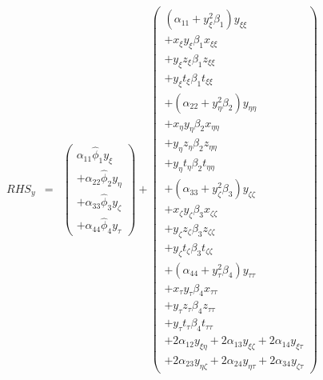\begin{eqnarray}
RHS_y
&=&
\left(
\begin{array}{r}
\alpha_{11} \widehat{\phi}_1 y_{\xi} 
\\
+
\alpha_{22} \widehat{\phi}_2 y_{\eta} 
\\
+
\alpha_{33} \widehat{\phi}_3 y_{\zeta} 
\\
+
\alpha_{44} \widehat{\phi}_4 y_{\tau} 
\end{array}
\right)
+
\left(
\begin{array}{r}
\left(\alpha_{11} + y_{\xi}^2 \beta_1 \right) y_{\xi \xi}
\\
+ x_{\xi} y_{\xi} \beta_1 x_{\xi \xi} 
\\
+ y_{\xi} z_{\xi} \beta_1 z_{\xi \xi} 
\\
+ y_{\xi} t_{\xi} \beta_1 t_{\xi \xi} 
\\
+
\left(\alpha_{22} + y_{\eta}^2 \beta_2 \right) y_{\eta \eta}
\\
+ x_{\eta} y_{\eta} \beta_2 x_{\eta \eta} 
\\
+ y_{\eta} z_{\eta} \beta_2 z_{\eta \eta} 
\\
+ y_{\eta} t_{\eta} \beta_2 t_{\eta \eta} 
\\
+
\left(\alpha_{33} + y_{\zeta}^2 \beta_3 \right) y_{\zeta \zeta}
\\
+ x_{\zeta} y_{\zeta} \beta_3 x_{\zeta \zeta} 
\\
+ y_{\zeta} z_{\zeta} \beta_3 z_{\zeta \zeta} 
\\
+ y_{\zeta} t_{\zeta} \beta_3 t_{\zeta \zeta} 
\\
+
\left(\alpha_{44} + y_{\tau}^2 \beta_4 \right) y_{\tau \tau}
\\
+ x_{\tau} y_{\tau} \beta_4 x_{\tau \tau} 
\\
+ y_{\tau} z_{\tau} \beta_4 z_{\tau \tau} 
\\
+ y_{\tau} t_{\tau} \beta_4 t_{\tau \tau} 
\\
+ 2 \alpha_{12} y_{\xi \eta}
+ 2 \alpha_{13} y_{\xi \zeta}
+ 2 \alpha_{14} y_{\xi \tau}
\\
+ 2 \alpha_{23} y_{\eta \zeta}
+ 2 \alpha_{24} y_{\eta \tau}
+ 2 \alpha_{34} y_{\zeta \tau}
\end{array}
\right)
\nonumber
\end{eqnarray}

